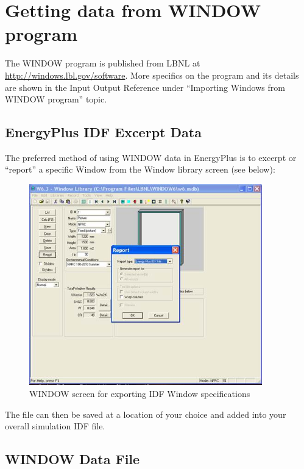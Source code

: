 \section{Getting data from WINDOW program}\label{getting-data-from-window-program}

The WINDOW program is published from LBNL at \url{http://windows.lbl.gov/software}. More specifics on the program and its details are shown in the Input Output Reference under ``Importing Windows from WINDOW program'' topic.

\subsection{EnergyPlus IDF Excerpt Data}\label{energyplus-idf-excerpt-data}

The preferred method of using WINDOW data in EnergyPlus is to excerpt or ``report'' a specific Window from the Window library screen (see below):

\begin{figure}[hbtp] %
\centering
\includegraphics[width=0.9\textwidth, height=0.9\textheight, keepaspectratio=true]{media/image001.jpg}
\caption{WINDOW screen for exporting IDF Window specifications \protect \label{fig:window-screen-for-exporting-idf-window}}
\end{figure}

The file can then be saved at a location of your choice and added into your overall simulation IDF file.

\subsection{WINDOW Data File}\label{window-data-file}

